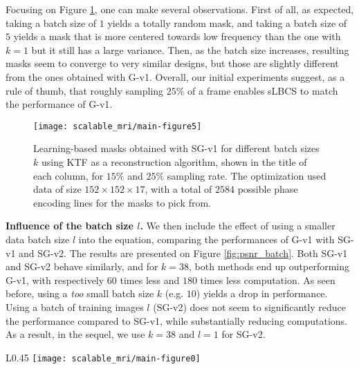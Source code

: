 Focusing on Figure \ref{fig:mask_sto_cycling}, one can make several observations. First of all, as expected, taking a batch size of $1$ yields a totally random mask, and taking a batch size of $5$ yields a mask that is more centered towards low frequency than the one with $k=1$ but it still has a large variance. Then, as the batch size increases, resulting masks seem to converge to very similar designs, but those are slightly different from the ones obtained with G-v1. Overall, our initial experiments suggest, as a rule of thumb, that roughly sampling $25\%$ of a frame enables sLBCS to match the performance of G-v1.

\begin{figure}[!ht]
    \centering
    \begin{minipage}[c]{.6\linewidth}
        \texttt{[image: scalable\_mri/main-figure5]}
    \end{minipage}\hfill
    \begin{minipage}[c]{.38\linewidth}
        \caption{Learning-based masks obtained with SG-v1 for different batch sizes $k$ using KTF as a reconstruction algorithm, shown in the title of each column, for $15\%$ and $25\%$ sampling rate. The optimization used data of size $152\times 152 \times 17$, with a total of $2584$ possible phase encoding lines for the masks to pick from.}\label{fig:mask_sto_cycling}
    \end{minipage} 
\end{figure}

\textbf{Influence of the batch size $l$.} We then include the effect of using a smaller data batch size $l$ into the equation, comparing the performances of G-v1 with SG-v1 and SG-v2. The results are presented on Figure \ref{fig:psnr_batch}. Both SG-v1 and SG-v2 behave similarly, and for $k=38$, both methods end up outperforming G-v1, with respectively $60$ times less and $180$ times less computation. As seen before, using a \textit{too} small batch size $k$ (e.g. $10$) yields a drop in performance. Using a batch of training images $l$ (SG-v2) does not seem to significantly reduce the performance compared to SG-v1, while substantially reducing computations. As a result, in the sequel, we use $k=38$ and $l=1$ for SG-v2.

\begin{wrapfigure}{L}{0.45\linewidth}
    \centering
    \texttt{[image: scalable\_mri/main-figure0]}
    \caption{PSNR as a function of the sampling rate for KTF, comparing the different reconstruction methods as well as the effect of the batch size on the quality of the reconstruction for SG. }\label{fig:psnr_batch}
\end{wrapfigure}

